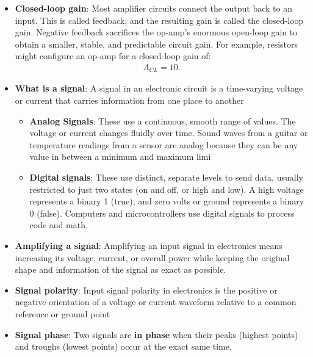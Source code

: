 \documentclass{report}
\begin{document}
\begin{itemize}
            An op-amp contains several internal transistor amplification stages. If one stage has a gain of 100 and another stage has a gain of 1,000, their combined gain is approximately:
            \begin{align*}
                100 \times 1000 = 100,000
            .\end{align*}
        \item \textbf{Closed-loop gain}: Most amplifier circuits connect the output back to an input. This is called feedback, and the resulting gain is called the closed-loop gain. Negative feedback sacrifices the op-amp’s enormous open-loop gain to obtain a smaller, stable, and predictable circuit gain.
            \bigbreak \noindent 
            For example, resistors might configure an op-amp for a closed-loop gain of:
            \begin{align*}
                A_{CL} = 10
            .\end{align*}
        \item \textbf{What is a signal}: A signal in an electronic circuit is a time-varying voltage or current that carries information from one place to another
            \begin{itemize}
                \item \textbf{Analog Signals}: These use a continuous, smooth range of values. The voltage or current changes fluidly over time. Sound waves from a guitar or temperature readings from a sensor are analog because they can be any value in between a minimum and maximum limi
                \item \textbf{Digital signals}: These use distinct, separate levels to send data, usually restricted to just two states (on and off, or high and low). A high voltage represents a binary 1 (true), and zero volts or ground represents a binary 0 (false). Computers and microcontrollers use digital signals to process code and math.
            \end{itemize}
        \item \textbf{Amplifying a signal}: Amplifying an input signal in electronics means increasing its voltage, current, or overall power while keeping the original shape and information of the signal as exact as possible.
        \item \textbf{Signal polarity}: Input signal polarity in electronics is the positive or negative orientation of a voltage or current waveform relative to a common reference or ground point
        \item \textbf{Signal phase}: Two signals are \textbf{in phase} when their peaks (highest points) and troughs (lowest points) occur at the exact same time.

\end{itemize}
\end{document}
